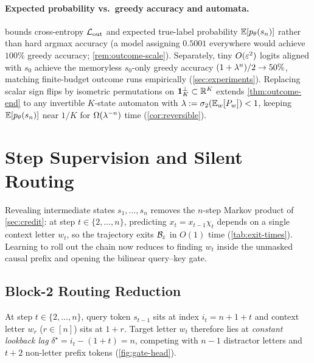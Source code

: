 \paragraph{Expected probability vs.\ greedy accuracy and automata.}
 bounds cross-entropy $\mathcal L_{\mathrm{out}}$ and expected true-label probability $\mathbb E[p_\theta(s_n)]$ rather than hard argmax accuracy (a model assigning $0.5001$ everywhere would achieve $100\%$ greedy accuracy; \cref{rem:outcome-scale}). Separately, tiny $O(\varepsilon^2)$ logits aligned with $s_0$ achieve the memoryless $s_0$-only greedy accuracy $(1 + \lambda^n)/2 \to 50\%$, matching finite-budget outcome runs empirically (\cref{sec:experiments}). Replacing scalar sign flips by isometric permutations on $\mathbf 1_K^\perp \subset \mathbb R^K$ extends \cref{thm:outcome-end} to any invertible $K$-state automaton with $\lambda := \sigma_2(\mathbb E_w[P_w]) < 1$, keeping $\mathbb E[p_\theta(s_n)]$ near $1/K$ for $\Omega(\lambda^{-n})$ time (\cref{cor:reversible}).

\section{Step Supervision and Silent Routing}
\label{sec:trajectory-results}
\label{sec:step}

Revealing intermediate states $s_1, \ldots, s_n$ removes the $n$-step Markov product of \cref{sec:credit}: at step $t \in \{2,\ldots,n\}$, predicting $x_t = x_{t-1}\chi_t$ depends on a single context letter $w_t$, so the trajectory exits $\mathcal B_{\varepsilon}$ in $O(1)$ time (\cref{tab:exit-times}). Learning to roll out the chain now reduces to finding $w_t$ inside the unmasked causal prefix and opening the bilinear query--key gate.

\subsection{Block-2 Routing Reduction}

At step $t \in \{2,\ldots,n\}$, query token $s_{t-1}$ sits at index $i_t = n + 1 + t$ and context letter $w_r$ ($r \in [n]$) sits at $1 + r$. Target letter $w_t$ therefore lies at \emph{constant lookback lag} $\delta^\star = i_t - (1 + t) = n$, competing with $n - 1$ distractor letters and $t + 2$ non-letter prefix tokens (\cref{fig:gate-head}).


